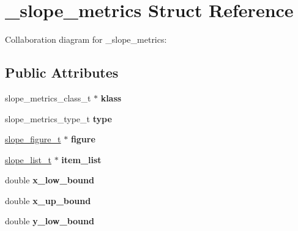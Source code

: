 \hypertarget{struct__slope__metrics}{\section{\+\_\+slope\+\_\+metrics Struct Reference}
\label{struct__slope__metrics}
}


Collaboration diagram for \+\_\+slope\+\_\+metrics\+:
\subsection*{Public Attributes}
\begin{DoxyCompactItemize}
\item 
\hypertarget{struct__slope__metrics_ac0be13f740c34881ef12ee711d02c4ab}{slope\+\_\+metrics\+\_\+class\+\_\+t $\ast$ {\bfseries klass}}\label{struct__slope__metrics_ac0be13f740c34881ef12ee711d02c4ab}

\item 
\hypertarget{struct__slope__metrics_a3aa8ff6d674059c26e68980d6196d655}{slope\+\_\+metrics\+\_\+type\+\_\+t {\bfseries type}}\label{struct__slope__metrics_a3aa8ff6d674059c26e68980d6196d655}

\item 
\hypertarget{struct__slope__metrics_a90f058e9225cd913f585c36739f95901}{\hyperlink{group__Figure_ga507cc82eeca8255d6c0f603ffdaeb59e}{slope\+\_\+figure\+\_\+t} $\ast$ {\bfseries figure}}\label{struct__slope__metrics_a90f058e9225cd913f585c36739f95901}

\item 
\hypertarget{struct__slope__metrics_a0a920646d930ff607bb8fc954b1cafbc}{\hyperlink{struct__slope__list}{slope\+\_\+list\+\_\+t} $\ast$ {\bfseries item\+\_\+list}}\label{struct__slope__metrics_a0a920646d930ff607bb8fc954b1cafbc}

\item 
\hypertarget{struct__slope__metrics_aa91b6061f72089b60903d8310d691464}{double {\bfseries x\+\_\+low\+\_\+bound}}\label{struct__slope__metrics_aa91b6061f72089b60903d8310d691464}

\item 
\hypertarget{struct__slope__metrics_a04c15859cae09965d4608144f87016c2}{double {\bfseries x\+\_\+up\+\_\+bound}}\label{struct__slope__metrics_a04c15859cae09965d4608144f87016c2}

\item 
\hypertarget{struct__slope__metrics_acdba84cfba06e6293e18ba29cc822e35}{double {\bfseries y\+\_\+low\+\_\+bound}}\label{struct__slope__metrics_acdba84cfba06e6293e18ba29cc822e35}


\end{DoxyCompactItemize}

